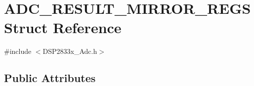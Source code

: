 \hypertarget{struct_a_d_c___r_e_s_u_l_t___m_i_r_r_o_r___r_e_g_s}{}\section{A\+D\+C\+\_\+\+R\+E\+S\+U\+L\+T\+\_\+\+M\+I\+R\+R\+O\+R\+\_\+\+R\+E\+G\+S Struct Reference}
\label{struct_a_d_c___r_e_s_u_l_t___m_i_r_r_o_r___r_e_g_s}


{\ttfamily \#include $<$D\+S\+P2833x\+\_\+\+Adc.\+h$>$}

\subsection*{Public Attributes}
